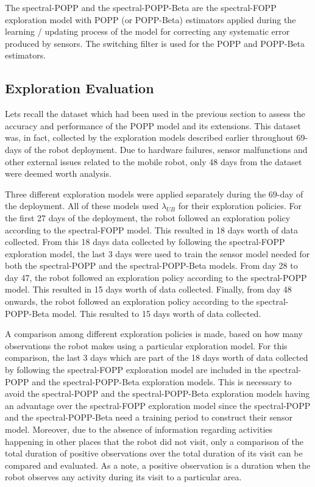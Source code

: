 The spectral-POPP and the spectral-POPP-Beta are the spectral-FOPP exploration model with POPP (or POPP-Beta) estimators applied during the learning / updating process of the model for correcting any systematic error produced by sensors. The switching filter is used for the POPP and POPP-Beta estimators.

\subsection*{Exploration Evaluation}

Lets recall the dataset which had been used in the previous section to assess the accuracy and performance of the POPP model and its extensions. This dataset was, in fact, collected by the exploration models described earlier throughout 69-days of the robot deployment. Due to hardware failures, sensor malfunctions and other external issues related to the mobile robot, only 48 days from the dataset were deemed worth analysis.

Three different exploration models were applied separately during the 69-day of
the deployment. All of these models used $\lambda_{UB}$ for their exploration policies. For the first 27 days of the deployment, the robot followed an exploration policy according to the spectral-FOPP model. This resulted in 18 days worth of data collected. From this 18 days data collected by following the spectral-FOPP exploration model, the last 3 days were used to train the sensor model needed for both the spectral-POPP and the spectral-POPP-Beta models. From day 28 to day 47, the robot followed an exploration policy according to the spectral-POPP model. This resulted in 15 days worth of data collected. Finally, from day 48 onwards, the robot followed an exploration policy according to the spectral-POPP-Beta model. This resulted to 15 days worth of data collected.

A comparison among different exploration policies is made, based on how many observations the robot makes using a particular exploration model. For this comparison, the last 3 days which are part of the 18 days worth of data collected by following the spectral-FOPP exploration model are included in the spectral-POPP and the spectral-POPP-Beta exploration models. This is necessary to avoid the spectral-POPP and the spectral-POPP-Beta exploration models having an advantage over the spectral-FOPP exploration model since the spectral-POPP and the spectral-POPP-Beta need a training period to construct their sensor model. Moreover, due to the absence of information regarding activities happening in other places that the robot did not visit, only a comparison of the total duration of positive observations over the total duration of its visit can be compared and evaluated. As a note, a positive observation is a duration when the robot observes any activity during its visit to a particular area. 

